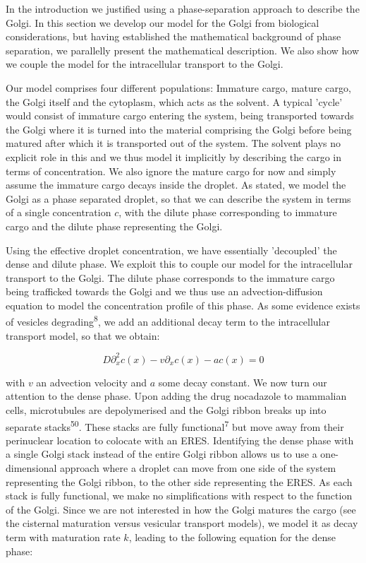 \documentclass{Dissertate}
\begin{document}
In the introduction we justified using a phase-separation approach to
describe the Golgi. In this section we develop our model for the Golgi
from biological considerations, but having established the mathematical
background of phase separation, we parallelly present the mathematical
description. We also show how we couple the model for the intracellular transport to the Golgi.

Our model comprises four different populations: Immature
cargo, mature cargo, the Golgi itself and the cytoplasm, which acts as the solvent. A typical 'cycle' would consist of immature cargo entering the system, being transported towards the Golgi where it is turned into the material comprising the Golgi before being matured after which it is transported out of the system. The solvent plays no explicit role in this and we thus model it implicitly by describing the cargo in terms of concentration. We also ignore the mature cargo for now and simply assume the immature cargo decays inside the droplet. As stated, we model the Golgi as a phase separated droplet, so that we can describe the system in terms of a single concentration $c$, with the dilute phase corresponding to immature cargo and the dilute phase representing the Golgi.

Using the effective droplet concentration, we have essentially 'decoupled' the dense and dilute phase. We exploit this to couple our model for the intracellular transport to the Golgi. The dilute phase corresponds to the immature cargo being trafficked towards the Golgi and we thus use an advection-diffusion equation to model the concentration profile of this phase. As some evidence exists of vesicles degrading\textsuperscript{8}, we add an additional decay term to the intracellular transport model, so that we obtain:

\begin{equation}
D\partial_x^2 c(x) - v\partial_xc(x)-ac(x)=0
\label{eq:cinside}\end{equation}

with \(v\) an advection velocity and \(a\) some decay constant. We now turn our attention to the dense phase. Upon adding the drug nocadazole to mammalian cells, microtubules are depolymerised and the Golgi ribbon breaks up into separate stacks\textsuperscript{50}. These stacks are fully functional\textsuperscript{7} but move away from their perinuclear
location to colocate with an ERES. Identifying the dense phase with a single Golgi stack instead of the entire Golgi ribbon allows us to use a one-dimensional approach where a droplet can move from one side of the system representing the Golgi ribbon, to the other side representing the ERES. 
As each stack is fully functional, we make no simplifications with respect to the function of the Golgi. Since we are not interested in how the Golgi matures the cargo (see the cisternal maturation versus vesicular transport models), we model it as decay term with maturation rate $k$, leading to the following equation for the dense phase:
\end{document}
